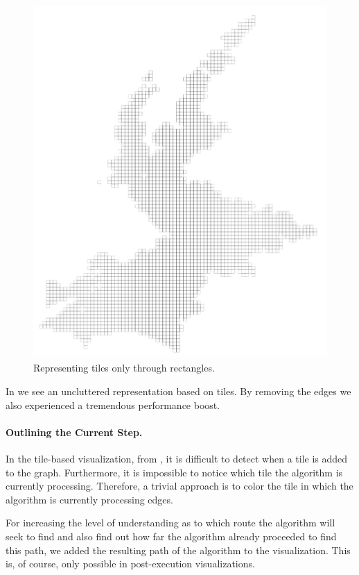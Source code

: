 \documentclass
[
    paper = a4,
    pagesize,
    12 pt,
    twoside,                       %
    open = right,
    DIV = calc,
    BCOR = 0 mm,                   %
    bibtotoc
]
{scrbook}
\begin{document}
\begin{figure}
        \includegraphics[width=\textwidth]{Images/vis-only-rectangles.png}
\caption[]{Representing tiles only through rectangles.}
\label{fig:only_rectangles}
\end{figure}

In  we see an uncluttered representation based on tiles.
By removing the edges we also experienced a tremendous performance boost.


\paragraph{Outlining the Current Step.}

In the tile-based visualization, from , it is difficult to detect when a tile is added to the graph.
Furthermore, it is impossible to notice which tile the algorithm is currently processing.
Therefore, a trivial approach is to color the tile in which the algorithm is currently processing edges.

For increasing the level of understanding as to which route the algorithm will seek to find and also find out how far the algorithm already proceeded to find this path, we added the resulting path of the algorithm to the visualization.
This is, of course, only possible in post-execution visualizations.
\end{document}
